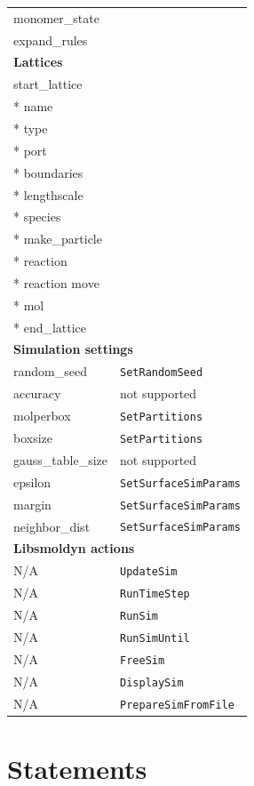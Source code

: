 \documentclass {book}
\newcommand {\ttt} {\texttt}
\begin{document}
\begin{longtable}[c]{ll}
monomer\_state \\ %
expand\_rules \\ %
\hline
\multicolumn{2}{l}{\hspace{0.3in}\textbf{Lattices}}\\
\hline
start\_lattice \\ %
{*} name \\ %
{*} type \\ %
{*} port \\ %
{*} boundaries \\ %
{*} lengthscale \\ %
{*} species \\ %
{*} make\_particle \\ %
{*} reaction \\ %
{*} reaction move \\ %
{*} mol \\ %
{*} end\_lattice \\ %
\hline
\multicolumn{2}{l}{\hspace{0.3in}\textbf{Simulation settings}}\\
\hline
random\_seed & \ttt{SetRandomSeed}\\
accuracy & not supported\\
molperbox & \ttt{SetPartitions}\\
boxsize & \ttt{SetPartitions}\\
gauss\_table\_size & not supported\\
epsilon & \ttt{SetSurfaceSimParams}\\
margin & \ttt{SetSurfaceSimParams}\\
neighbor\_dist & \ttt{SetSurfaceSimParams}\\
\hline
\multicolumn{2}{l}{\hspace{0.3in}\textbf{Libsmoldyn actions}}\\
\hline
N/A & \ttt{UpdateSim}\\
N/A & \ttt{RunTimeStep}\\
N/A & \ttt{RunSim}\\
N/A & \ttt{RunSimUntil}\\
N/A & \ttt{FreeSim}\\
N/A & \ttt{DisplaySim}\\
N/A & \ttt{PrepareSimFromFile}\\
\end{longtable}


\chapter{Statements}
\end{document}
